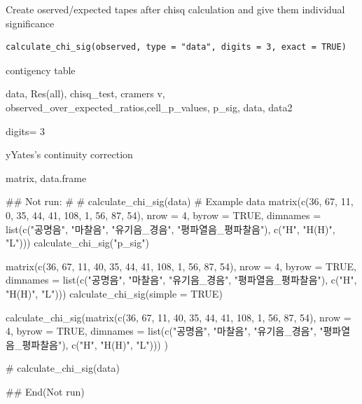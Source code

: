 \documentclass[a4paper]{book}
\begin{document}
%
\begin{Description}
Create oserved/expected tapes after chisq calculation and give them individual significance
\end{Description}
%
\begin{Usage}
\begin{verbatim}
calculate_chi_sig(observed, type = "data", digits = 3, exact = TRUE)
\end{verbatim}
\end{Usage}
%
\begin{Arguments}
\begin{ldescription}
\item[\code{observed}] contigency table

\item[\code{type}] data, Res(all), chisq\_test, cramers v, observed\_over\_expected\_ratios,cell\_p\_values, p\_sig, data, data2

\item[\code{digits}] digits= 3

\item[\code{exact}] yYates's continuity correction
\end{ldescription}
\end{Arguments}
%
\begin{Value}
matrix, data.frame
\end{Value}
%
\begin{Examples}
\begin{ExampleCode}

\#\# Not run: 
# # calculate_chi_sig(data)
# Example data
matrix(c(36, 67, 11,
          0, 35, 44,
         41, 108, 1,
          56, 87, 54),
           nrow = 4, byrow = TRUE,
   dimnames = list(c("공명음", "마찰음",
     "유기음_경음", "평파열음_평파찰음"),  c("H", "H(H)", "L"))) %
     calculate_chi_sig("p_sig")


     matrix(c(36, 67, 11,
              40, 35, 44,
              41, 108, 1,
              56, 87, 54), nrow = 4, byrow = TRUE,
                     dimnames = list(c("공명음", "마찰음",
                                    "유기음_경음", "평파열음_평파찰음"),
                                 c("H", "H(H)", "L"))) %
                calculate_chi_sig(simple = TRUE)



  calculate_chi_sig(matrix(c(36, 67, 11,
                      40, 35, 44,
                   41, 108, 1,
              56, 87, 54), nrow = 4, byrow = TRUE,
               dimnames = list(c("공명음", "마찰음",
              "유기음_경음", "평파열음_평파찰음"),
              c("H", "H(H)", "L")))   )


 # calculate_chi_sig(data)

## End(Not run)

\end{ExampleCode}
\end{Examples}
\end{document}
